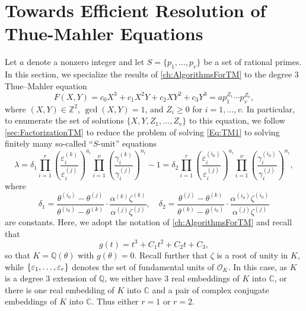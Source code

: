 
\chapter{Towards Efficient Resolution of Thue-Mahler Equations}
\label{ch:EfficientTMSolver}

Let $a$ denote a nonzero integer and let $S=\{p_1,\dotsc,p_v\}$ be a set of rational primes. In this section, we specialize the results of \autoref{ch:AlgorithmsForTM} to the degree $3$ Thue--Mahler equation
\begin{equation} \label{Eq:TM1}
F(X,Y) = c_0 X^3 + c_1 X^{2}Y + c_2XY^2 + c_3Y^3 = a p_1^{Z_1}\cdots p_v^{Z_v},
\end{equation}
where $(X,Y) \in \mathbb{Z}^2$, $\gcd(X,Y)=1$, and $Z_i \geq 0$ for $i = 1, \dots, v$. In particular, to enumerate the set of solutions $\{X,Y, Z_1, \dots, Z_v\}$ to this equation, we follow \autoref{sec:FactorizationTM} to reduce the problem of solving \eqref{Eq:TM1} to solving finitely many so-called ``$S$-unit'' equations
\begin{equation} \label{eq:EfficientSunit}
\lambda = \delta_1 \prod_{i = 1}^r\left( \frac{\varepsilon_i^{(k)}}{\varepsilon_i^{(j)}}\right)^{a_i}\prod_{i = 1}^{\nu} \left( \frac{\gamma_i^{(k)}}{\gamma_i^{(j)}}\right)^{n_i} - 1 = \delta_2 \prod_{i = 1}^{r}\left( \frac{\varepsilon_i^{(i_0)}}{\varepsilon_i^{(j)}}\right)^{a_i} \prod_{i = 1}^{\nu} \left( \frac{\gamma_i^{(i_0)}}{\gamma_i^{(j)}}\right)^{n_i},
\end{equation}
where
\[\delta_1 = \frac{\theta^{(i_0)} - \theta^{(j)}}{\theta^{(i_0)} - \theta^{(k)}}\cdot\frac{\alpha^{(k)}\zeta^{(k)}}{\alpha^{(j)}\zeta^{(j)}}, \quad \delta_2 = \frac{\theta^{(j)} - \theta^{(k)}}{\theta^{(k)} - \theta^{(i_0)}}\cdot \frac{\alpha^{(i_0)}\zeta^{(i_0)}}{\alpha^{(j)}\zeta^{(j)}}\]
are constants. Here, we adopt the notation of \autoref{ch:AlgorithmsForTM} and recall that 
\[g(t) = t^3 + C_1t^2 + C_2t + C_3,\]
so that $K = \mathbb{Q}(\theta)$ with $g(\theta) = 0$. Recall further that $\zeta$ is a root of unity in $K$, while $\{\varepsilon_1, \dots, \varepsilon_r\}$ denotes the set of fundamental units of $\mathcal{O}_K$. In this case, as $K$ is a degree $3$ extension of $\mathbb{Q}$, we either have $3$ real embeddings of $K$ into $\mathbb{C}$, or there is one real embedding of $K$ into $\mathbb{C}$ and a pair of complex conjugate embeddings of $K$ into $\mathbb{C}$. Thus either $r = 1$ or $r = 2$. 

